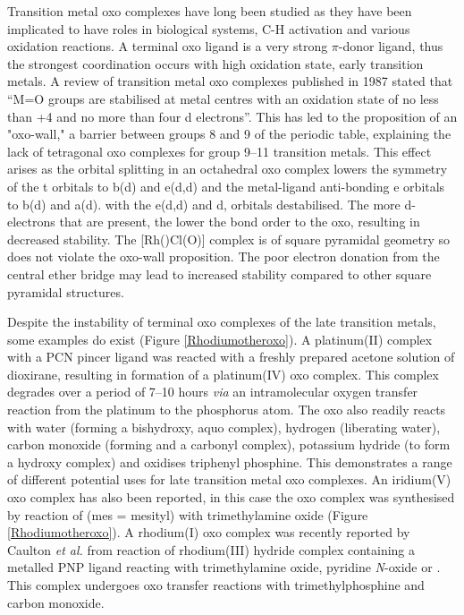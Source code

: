 Transition metal oxo complexes have long been studied as they have been implicated to have roles in  biological systems,\cite{Lipscomb1994, Merkx2001, Tinberg2011, Montellano2010} C-H activation\cite{Balcells2010, Borovik2011} and various oxidation reactions\cite{Holm1987, Atlay1983, Poverenov2008}.  A terminal oxo ligand is a very strong $\pi$-donor ligand, thus the strongest coordination occurs with high oxidation state, early transition metals\cite{Anderson2004}.  A review of transition metal oxo complexes published in 1987 stated that ``M=O groups are stabilised at metal centres with an oxidation state of no less than +4 and no more than four d electrons''.\cite{Holm1987}  This has led to the proposition of an "oxo-wall," a barrier between groups 8 and 9 of the periodic table, explaining the lack of tetragonal oxo complexes for group 9--11 transition metals.\cite{Winkler2011}  This effect arises as the orbital splitting in an octahedral oxo complex lowers the symmetry of the t orbitals to b(d) and e(d,d) and the metal-ligand anti-bonding e orbitals to b(d) and a(d).  with the e(d,d) and d, orbitals destabilised.\cite{Betley2008}  The more d-electrons that are present, the lower the bond order to the oxo, resulting in decreased stability.  The [Rh(\tBuxantphos)Cl(O)] complex is of square pyramidal geometry so does not violate the oxo-wall proposition.  The poor electron donation from the central ether bridge may lead to increased stability compared to other square pyramidal structures.  

Despite the instability of terminal oxo complexes of the late transition metals, some examples do exist (Figure \ref{Rhodiumotheroxo}).  A platinum(II) complex with a PCN pincer ligand was reacted with a freshly prepared acetone solution of dioxirane, resulting in formation of a platinum(IV) oxo complex.\cite{Poverenov2008}  This complex degrades over a period of 7--10 hours \emph{via} an intramolecular oxygen transfer reaction from the platinum to the phosphorus atom.  The oxo also readily reacts with water (forming a bishydroxy, aquo complex), hydrogen (liberating water), carbon monoxide (forming  and a carbonyl complex), potassium hydride (to form a hydroxy complex) and oxidises triphenyl phosphine.  This demonstrates a range of different potential uses for late transition metal oxo complexes.  An iridium(V) oxo complex has also been reported, in this case the oxo complex was synthesised by reaction of \ce{[Ir(mes)3]} (mes = mesityl) with trimethylamine oxide (Figure \ref{Rhodiumotheroxo}).\cite{Motherwell1993}  A rhodium(I) oxo complex was recently reported by Caulton \emph{et al.} from reaction of rhodium(III) hydride complex containing a metalled PNP ligand reacting with trimethylamine oxide, pyridine \emph{N}-oxide or .\cite{Verat2008, Tsvetkov2013}  This complex undergoes oxo transfer reactions with trimethylphosphine and carbon monoxide.

